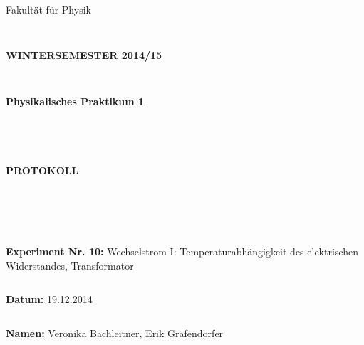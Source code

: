 \documentclass{article}
\begin{document}
\thispagestyle{empty}
			\begin{center}
			\Large{Fakultät für Physik}\\
			\end{center}
\begin{verbatim}


\end{verbatim}
			\begin{center}
			\textbf{\LARGE WINTERSEMESTER 2014/15}
			\end{center}
\begin{verbatim}


\end{verbatim}
			\begin{center}
			\textbf{\LARGE{Physikalisches Praktikum 1}}
			\end{center}
\begin{verbatim}




\end{verbatim}

			\begin{center}
			\textbf{\LARGE{PROTOKOLL}}
			\end{center}
			
\begin{verbatim}





\end{verbatim}

			\begin{flushleft}
			\textbf{\Large{Experiment Nr. 10:}} \Large{Wechselstrom I:
Temperaturabhängigkeit des elektrischen Widerstandes,
Transformator}\\
			\LARGE{}	
			\end{flushleft}

\begin{verbatim}

\end{verbatim}	
			\begin{flushleft}
			\textbf{\Large{Datum:}} \Large{19.12.2014}
			\end{flushleft}
			
\begin{verbatim}
\end{verbatim}
		\begin{flushleft}
			\textbf{\Large{Namen:}} \Large{Veronika Bachleitner, Erik Grafendorfer}
			\end{flushleft}
\end{document}

